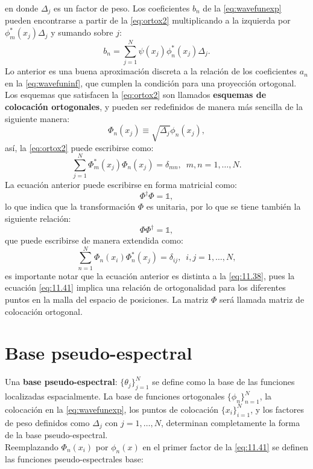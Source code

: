 \noindent en donde $\Delta_j$ es un factor de peso. Los coeficientes $b_n$ de la \autoref{eq:wavefunexp} pueden encontrarse a partir de la \autoref{eq:ortox2} multiplicando a la izquierda por $\phi_m^*(x_j)\Delta_j$ y sumando sobre $j$:
\begin{equation}
  \label{eq:11.36}
  b_n = \sum_{j=1}^N\psi(x_j)\phi_n^*(x_j)\Delta_j.
\end{equation}
Lo anterior es una buena aproximación discreta a la relación de los coeficientes $a_n$ en la \autoref{eq:wavefuninf}, que cumplen la condición para una proyección ortogonal. Los esquemas que satisfacen la \autoref{eq:ortox2} son llamados \textbf{esquemas de colocación ortogonales}, y pueden ser redefinidos de manera más sencilla de la siguiente manera:
\begin{equation}
  \label{eq:11.37}
  \Phi_n(x_j) \equiv \sqrt{\Delta_j} \phi_n(x_j),
\end{equation}
así, la \autoref{eq:ortox2} puede escribirse como:
\begin{equation}
  \label{eq:11.38}
  \sum_{j=1}^N \Phi_m^*(x_j)\Phi_n(x_j) = \delta_{mn}, \,\,\, m,n=1,\dots,N.
\end{equation}
La ecuación anterior puede escribirse en forma matricial como:
\begin{equation}
  \label{eq:11.39}
  \Phi^{\dag}\Phi=\mathbb{1},
\end{equation}
lo que indica que la transformación $\Phi$ es unitaria, por lo que se tiene también la siguiente relación:
\begin{equation}
  \label{eq:11.40}
  \Phi\Phi^{\dag} = \mathbb{1},
\end{equation}
que puede escribirse de manera extendida como:
\begin{equation}
  \label{eq:11.41}
  \sum_{n=1}^N \Phi_n(x_i)\Phi_n^*(x_j) = \delta_{ij}, \,\,\, i,j=1,\dots,N,
\end{equation}
es importante notar que la ecuación anterior es distinta a la \autoref{eq:11.38}, pues la ecuación \autoref{eq:11.41} implica una relación de ortogonalidad para los diferentes puntos en la malla del espacio de posiciones. La matriz $\Phi$ será llamada matriz de colocación ortogonal.

\section{Base pseudo-espectral}\label{sec:ps-basis}

Una \textbf{base pseudo-espectral}: $\{\theta_j\}_{j=1}^N$ se define como la base de las funciones localizadas espacialmente. La base de funciones ortogonales $\{\phi_n\}_{n=1}^N$, la colocación en la \autoref{eq:wavefunexp}, los puntos de colocación $\{x_i\}_{i=1}^N$, y los factores de peso definidos como $\Delta_j$ con $j=1,\dots,N$, determinan completamente la forma de la base pseudo-espectral. \\
Reemplazando $\Phi_n(x_i)$ por $\phi_n(x)$ en el primer factor de la \autoref{eq:11.41} se definen las funciones pseudo-espectrales base:

